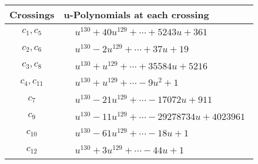 \documentclass[1p]{elsarticle_modified}
\theoremstyle{definition}
\begin{document}
\begin{tabular}{m{50pt}|m{274pt}}
Crossings & \hspace{64pt}u-Polynomials at each crossing \\
\hline $$\begin{aligned}c_{1},c_{5}\end{aligned}$$&$\begin{aligned}
&u^{130}+40 u^{129}+\cdots+5243 u+361
\end{aligned}$\\
\hline $$\begin{aligned}c_{2},c_{6}\end{aligned}$$&$\begin{aligned}
&u^{130}-2 u^{129}+\cdots+37 u+19
\end{aligned}$\\
\hline $$\begin{aligned}c_{3},c_{8}\end{aligned}$$&$\begin{aligned}
&u^{130}+u^{129}+\cdots+35584 u+5216
\end{aligned}$\\
\hline $$\begin{aligned}c_{4},c_{11}\end{aligned}$$&$\begin{aligned}
&u^{130}+u^{129}+\cdots-9 u^2+1
\end{aligned}$\\
\hline $$\begin{aligned}c_{7}\end{aligned}$$&$\begin{aligned}
&u^{130}-21 u^{129}+\cdots-17072 u+911
\end{aligned}$\\
\hline $$\begin{aligned}c_{9}\end{aligned}$$&$\begin{aligned}
&u^{130}-11 u^{129}+\cdots-29278734 u+4023961
\end{aligned}$\\
\hline $$\begin{aligned}c_{10}\end{aligned}$$&$\begin{aligned}
&u^{130}-61 u^{129}+\cdots-18 u+1
\end{aligned}$\\
\hline $$\begin{aligned}c_{12}\end{aligned}$$&$\begin{aligned}
&u^{130}+3 u^{129}+\cdots-44 u+1
\end{aligned}$\\
\hline
\end{tabular}\\~\\
\end{document}
